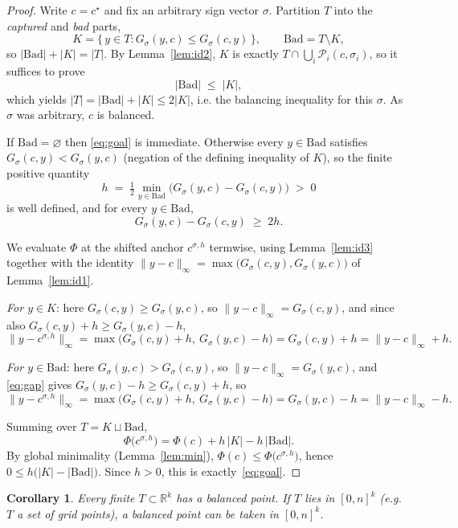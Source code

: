 \documentclass[11pt]{article}
\theoremstyle{plain}
\newtheorem{corollary}{Corollary}
\theoremstyle{definition}
\theoremstyle{remark}
\newcommand{\R}{\mathbb{R}}
\newcommand{\Rk}{\R^{k}}
\newcommand{\linf}[1]{\lVert #1 \rVert_{\infty}}
\newcommand{\card}[1]{\lvert #1 \rvert}
\newcommand{\Pyr}{\mathcal{P}}
\newcommand{\sgn}{\sigma}
\newcommand{\FW}{\Phi}
\begin{document}
\begin{proof}
Write $c=c^\star$ and fix an arbitrary sign vector $\sgn$. Partition $T$ into the
\emph{captured} and \emph{bad} parts,
\[
  K=\{\,y\in T: G_\sgn(y,c)\le G_\sgn(c,y)\,\},
  \qquad
  \mathrm{Bad}=T\setminus K,
\]
so $\card{\mathrm{Bad}}+\card{K}=\card{T}$. By Lemma~\ref{lem:id2}, $K$ is
exactly $T\cap\bigcup_i\Pyr_i(c,\sgn_i)$, so it suffices to prove
\begin{equation}\label{eq:goal}
  \card{\mathrm{Bad}}\;\le\;\card{K},
\end{equation}
which yields $\card{T}=\card{\mathrm{Bad}}+\card{K}\le 2\card{K}$, i.e. the
balancing inequality for this $\sgn$. As $\sgn$ was arbitrary, $c$ is balanced.

If $\mathrm{Bad}=\varnothing$ then \eqref{eq:goal} is immediate. Otherwise every
$y\in\mathrm{Bad}$ satisfies $G_\sgn(c,y)<G_\sgn(y,c)$ (negation of the defining
inequality of $K$), so the finite positive quantity
\[
  h\;=\;\tfrac12\min_{y\in\mathrm{Bad}}\bigl(G_\sgn(y,c)-G_\sgn(c,y)\bigr)\;>\;0
\]
is well defined, and for every $y\in\mathrm{Bad}$,
\begin{equation}\label{eq:gap}
  G_\sgn(y,c)-G_\sgn(c,y)\;\ge\;2h.
\end{equation}

We evaluate $\FW$ at the shifted anchor $c^{\sgn,h}$ termwise, using
Lemma~\ref{lem:id3} together with the identity
$\linf{y-c}=\max\bigl(G_\sgn(c,y),G_\sgn(y,c)\bigr)$ of Lemma~\ref{lem:id1}.

\emph{For $y\in K$}: here $G_\sgn(c,y)\ge G_\sgn(y,c)$, so
$\linf{y-c}=G_\sgn(c,y)$, and since also
$G_\sgn(c,y)+h\ge G_\sgn(y,c)-h$,
\[
  \linf{y-c^{\sgn,h}}
  =\max\bigl(G_\sgn(c,y)+h,\ G_\sgn(y,c)-h\bigr)
  =G_\sgn(c,y)+h=\linf{y-c}+h.
\]

\emph{For $y\in\mathrm{Bad}$}: here $G_\sgn(y,c)>G_\sgn(c,y)$, so
$\linf{y-c}=G_\sgn(y,c)$, and \eqref{eq:gap} gives
$G_\sgn(y,c)-h\ge G_\sgn(c,y)+h$, so
\[
  \linf{y-c^{\sgn,h}}
  =\max\bigl(G_\sgn(c,y)+h,\ G_\sgn(y,c)-h\bigr)
  =G_\sgn(y,c)-h=\linf{y-c}-h.
\]

Summing over $T=K\sqcup\mathrm{Bad}$,
\[
  \FW\!\bigl(c^{\sgn,h}\bigr)
  =\FW(c)+h\,\card{K}-h\,\card{\mathrm{Bad}}.
\]
By global minimality (Lemma~\ref{lem:min}),
$\FW(c)\le\FW\!\bigl(c^{\sgn,h}\bigr)$, hence
$0\le h\bigl(\card{K}-\card{\mathrm{Bad}}\bigr)$. Since $h>0$, this is
exactly~\eqref{eq:goal}.
\end{proof}

\begin{corollary}
Every finite $T\subset\Rk$ has a balanced point. If $T$ lies in
$[0,n]^k$ (e.g.\ $T$ a set of grid points), a balanced point can be taken in
$[0,n]^k$.
\end{corollary}
\end{document}
